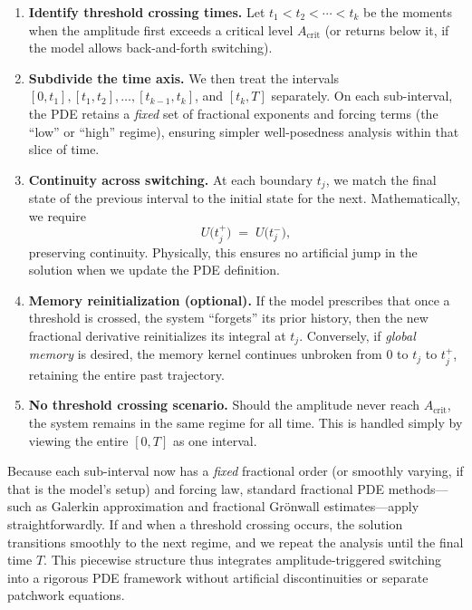\documentclass[12pt]{article}
\begin{document}
\begin{enumerate}
    \item \textbf{Identify threshold crossing times.} 
    Let $t_1 < t_2 < \cdots < t_k$ be the moments when the amplitude first exceeds 
    a critical level $A_{\mathrm{crit}}$ (or returns below it, if the model allows 
    back-and-forth switching).
    
    \item \textbf{Subdivide the time axis.}
    We then treat the intervals $[0,t_1], [t_1,t_2], \dots, [t_{k-1}, t_k]$, and $[t_k,T]$ 
    separately. On each sub-interval, the PDE retains a \emph{fixed} set of fractional 
    exponents and forcing terms (the “low” or “high” regime), ensuring simpler 
    well-posedness analysis within that slice of time.

    \item \textbf{Continuity across switching.}
    At each boundary $t_j$, we match the final state of the previous interval to 
    the initial state for the next. Mathematically, we require
    \[
      U\bigl(t_j^+\bigr) \;=\; U\bigl(t_j^-\bigr),
    \]
    preserving continuity. Physically, this ensures no artificial jump in the solution 
    when we update the PDE definition.

    \item \textbf{Memory reinitialization (optional).}
    If the model prescribes that once a threshold is crossed, the system “forgets” 
    its prior history, then the new fractional derivative reinitializes its integral 
    at $t_j$. Conversely, if \emph{global memory} is desired, the memory kernel 
    continues unbroken from $0$ to $t_j$ to $t_j^+$, retaining the entire past 
    trajectory.

    \item \textbf{No threshold crossing scenario.}
    Should the amplitude never reach $A_{\mathrm{crit}}$, the system remains in 
    the same regime for all time. This is handled simply by viewing the entire 
    $[0,T]$ as one interval.

\end{enumerate}

\noindent
Because each sub-interval now has a \emph{fixed} fractional order (or smoothly varying, 
if that is the model’s setup) and forcing law, standard fractional PDE methods—such 
as Galerkin approximation and fractional Grönwall estimates—apply straightforwardly. 
If and when a threshold crossing occurs, the solution transitions smoothly to the 
next regime, and we repeat the analysis until the final time $T$. This piecewise 
structure thus integrates amplitude-triggered switching into a rigorous PDE framework 
without artificial discontinuities or separate patchwork equations.
\end{document}
